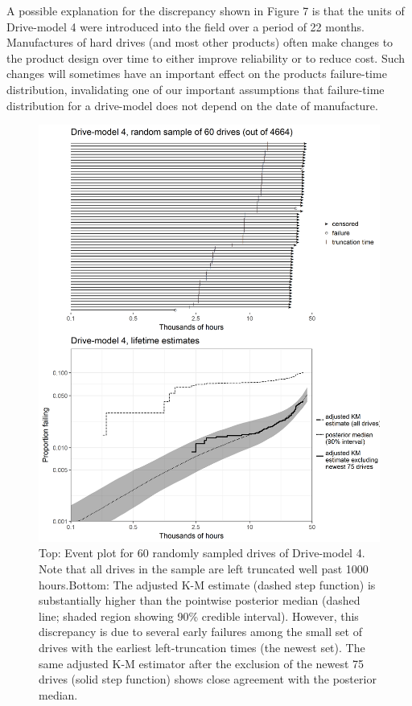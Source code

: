 \documentclass[aoas]{imsart}
\begin{document}
A possible explanation for the discrepancy shown in Figure 7 is that
the units of Drive-model 4 were introduced into the field over a
period of 22 months. Manufactures of hard drives (and most other
products) often make changes to the product design over time to
either improve reliability or to reduce cost. Such changes will
sometimes have an important effect on the products failure-time
distribution, invalidating one of our important assumptions that
failure-time distribution for a drive-model does not depend on the
date of manufacture. 

\begin{figure}
\centering
\includegraphics[height=.8\textheight]{dm4-exception.png}
\caption{\footnotesize Top: Event plot for 60 randomly sampled drives of Drive-model 4. Note that all drives in the sample are left truncated well past 1000 hours.\hspace{\textwidth}Bottom: The adjusted K-M estimate (dashed step function) is substantially higher than the pointwise posterior median (dashed line; shaded region showing 90\% credible interval). However, this discrepancy is due to several early failures among the small set of drives with the earliest left-truncation times (the newest set). The same adjusted K-M estimator after the exclusion of the newest 75 drives (solid step function) shows close agreement with the posterior median.}

\label{fig:ex-mod-4}
\end{figure}
\end{document}
